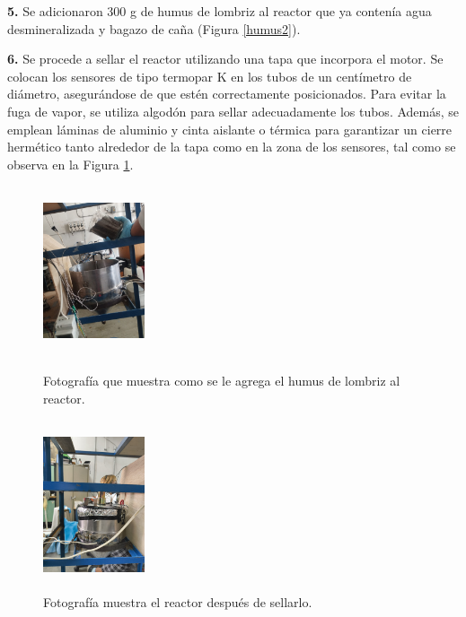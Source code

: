 \documentclass[12pt]{article}
\begin{document}
			\textbf{5.}	Se adicionaron 300 g de humus de lombriz al reactor que ya contenía agua desmineralizada y bagazo de caña (Figura \ref{humus2}).
			

			\textbf{6.} Se procede a sellar el reactor utilizando una tapa que incorpora el motor. Se colocan los sensores de tipo termopar K en los tubos de un centímetro de diámetro, asegurándose de que estén correctamente posicionados. Para evitar la fuga de vapor, se utiliza algodón para sellar adecuadamente los tubos. Además, se emplean láminas de aluminio y cinta aislante o térmica para garantizar un cierre hermético tanto alrededor de la tapa como en la zona de los sensores, tal como se observa en la Figura \ref{cellado del reactor}.
			
		
			
	\begin{figure}[H]
		\centering
		\begin{minipage}{0.46\textwidth}
			\centering
			\includegraphics[width=3cm, height=5cm]{imagenes/humus2} %
			\caption{Fotografía que muestra como se le agrega el humus de lombriz al reactor.}
				\label{humus2}
			\end{minipage}
			\hfill
			\begin{minipage}{0.48\textwidth}
				\centering
				\includegraphics[width=3cm, height=5cm]{imagenes/cellado del reactor} %
				\caption{Fotografía muestra el reactor después de sellarlo.}
				\label{cellado del reactor}
			\end{minipage}
		\end{figure}
		
\end{document}
